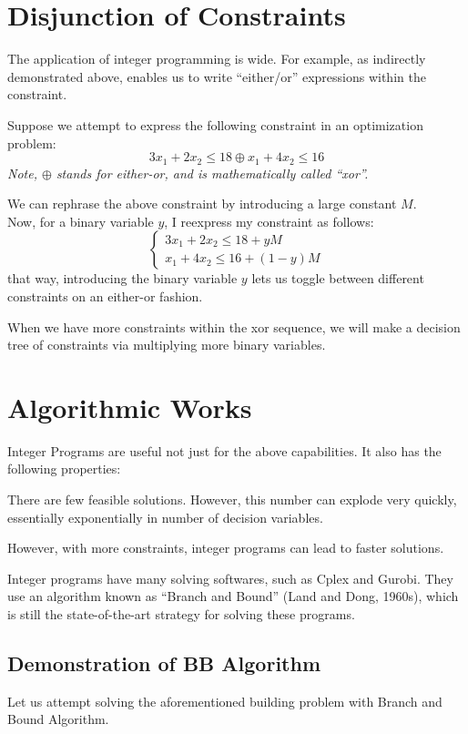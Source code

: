 \section{Disjunction of Constraints}
The application of integer programming is wide.
For example, as indirectly demonstrated above, enables us to write ``either/or'' expressions within the constraint.

Suppose we attempt to express the following constraint in an optimization problem:
\[
    3x_1 + 2x_2 \leq 18 \oplus x_1 + 4x_2 \leq 16
\]
\textit{Note, $\oplus$ stands for either-or, and is mathematically called ``xor''.}

We can rephrase the above constraint by introducing a large constant $M$. \\
Now, for a binary variable $y$, I reexpress my constraint as follows:
\[
    \begin{cases}
        3x_1 + 2x_2 \leq 18 + yM \\
        x_1 + 4x_2 \leq 16 + (1 - y) M
    \end{cases}
\]
that way, introducing the binary variable $y$ lets us toggle between different constraints on an either-or fashion.

When we have more constraints within the xor sequence, we will make a decision tree of constraints via multiplying more binary variables.

\section{Algorithmic Works}
Integer Programs are useful not just for the above capabilities.
It also has the following properties:
\begin{bindenum}
    \item There are few feasible solutions. However, this number can explode very quickly, essentially exponentially in number of decision variables.
    \item However, with more constraints, integer programs can lead to faster solutions.
\end{bindenum}

Integer programs have many solving softwares, such as Cplex and Gurobi.
They use an algorithm known as ``Branch and Bound'' (Land and Dong, 1960s), which is still the state-of-the-art strategy for solving these programs.

\subsection{Demonstration of BB Algorithm}
Let us attempt solving the aforementioned building problem with Branch and Bound Algorithm.


